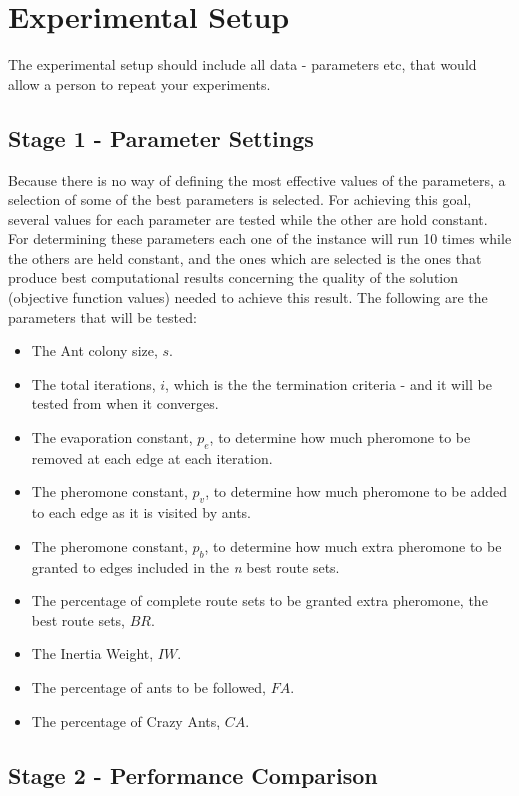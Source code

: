 \section{Experimental Setup}

The experimental setup should include all data - parameters etc, that would allow a person to repeat your experiments. 
 
\subsection{Stage 1 - Parameter Settings}
\label{subsec:parameterSettings_setup}

Because there is no way of defining the most effective values of the parameters, a selection of some of the best parameters is selected. For achieving this goal, several values for each parameter are tested while the other are hold constant. For determining these parameters each one of the instance will run 10 times while the others are held constant, and the ones which are selected is the ones that produce best computational results concerning the quality of the solution (objective function values) needed to achieve this result. The following are the parameters that will be tested:

\begin{itemize}
\item The Ant colony size, $s$.
\item The total iterations, $i$, which is the the termination criteria - and it will be tested from when it converges. 
\item The evaporation constant, $p_{e}$, to determine how much pheromone to be removed at each edge at each iteration. 
\item The pheromone constant, $p_{v}$, to determine how much pheromone to be added to each edge as it is visited by ants. 
\item The pheromone constant, $p_{b}$, to determine how much extra pheromone to be granted to edges included in the \textit{n} best route sets.
\item The percentage of complete route sets to be granted extra pheromone, the best route sets, $BR$.
\item The Inertia Weight, $IW$.
\item The percentage of ants to be followed, $FA$.
\item The percentage of Crazy Ants, $CA$.
\end{itemize}

\subsection{Stage 2 - Performance Comparison}

